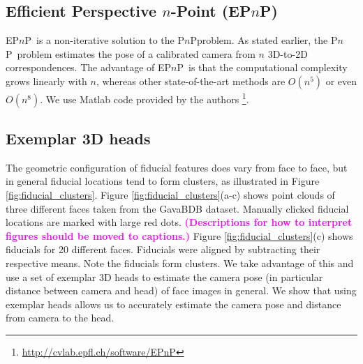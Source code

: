 \documentclass[runningheads]{llncs}
\newcommand {\ericnote} [1] {{\bf \textcolor{magenta}{(#1)}}}
\newcommand {\PnP} {P$n$P}
\newcommand {\EPnP} {EP$n$P}
\begin{document}
\subsection{Efficient Perspective $n$-Point (\EPnP)}
\EPnP~is a non-iterative solution to the \PnP problem.  
As stated earlier, the \PnP~problem estimates the pose of a calibrated camera from $n$ 3D-to-2D correspondences.  
The advantage of \EPnP~is that the computational complexity grows linearly with $n$, whereas other state-of-the-art methods are $O(n^5)$ or even $O(n^8)$.  
We use Matlab code provided by the authors \footnote{\url{http://cvlab.epfl.ch/software/EPnP}}.

\subsection{Exemplar 3D heads}
The geometric configuration of fiducial features does vary from face to face, but in general fiducial locations tend to form clusters, as illustrated in Figure \ref{fig:fiducial_clusters}.  
Figure \ref{fig:fiducial_clusters}(a-c) shows point clouds of three different faces taken from the GavaBDB \cite{moreno2004gavabdb} dataset. 
Manually clicked fiducial locations are marked with large red dots.
\ericnote{Descriptions for how to interpret figures should be moved to captions.}
Figure \ref{fig:fiducial_clusters}(c) shows fiducials for 20 different faces.  Fiducials were aligned by subtracting their respective means.  
Note the fiducials form clusters.  
We take advantage of this and use a set of exemplar 3D heads to estimate the camera pose (in particular distance between camera and head) of face images in general. 
We show that using exemplar heads allows us to accurately estimate the camera pose and distance from camera to the head.
\end{document}
